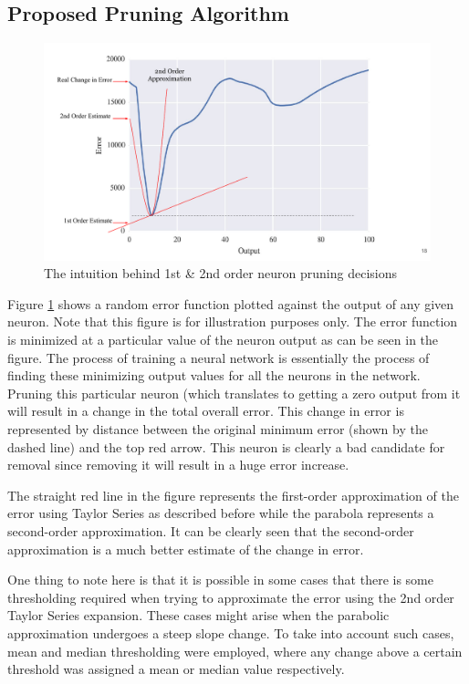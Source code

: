 \subsection{Proposed Pruning Algorithm}
\begin{figure}
  \includegraphics[width=\linewidth]{png/intuition.pdf}
  \caption{The intuition behind 1st \& 2nd order neuron pruning decisions}
  \label{fig:intuition}
\end{figure}

Figure \ref{fig:intuition} shows a random error function plotted against the output of any given neuron. Note that this figure is for illustration purposes only. The error function is minimized at a particular value of the neuron output as can be seen in the figure. The process of training a neural network is essentially the process of finding these minimizing output values for all the neurons in the network. Pruning this particular neuron (which translates to getting a zero output from it will result in a change in the total overall error. This change in error is represented by distance between the original minimum error (shown by the dashed line) and the top red arrow. This neuron is clearly a bad candidate for removal since removing it will result in a huge error increase. 

The straight red line in the figure represents the first-order approximation of the error using Taylor Series as described before while the parabola represents a second-order approximation. It can be clearly seen that the second-order approximation is a much better estimate of the change in error.

One thing to note here is that it is possible in some cases that there is some thresholding required when trying to approximate the error using the 2nd order Taylor Series expansion. These cases might arise when the parabolic approximation undergoes a steep slope change. To take into account such cases, mean and median thresholding were employed, where any change above a certain threshold was assigned a mean or median value respectively.

